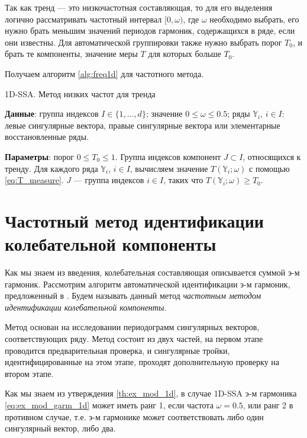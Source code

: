 \documentclass[specialist,
               substylefile = spbu.rtx,
               subf,href,colorlinks=true, 12pt]{disser}
\begin{document}
Так как тренд --- это низкочастотная составляющая, то для его выделения логично рассматривать частотный интервал $[0, \omega)$, где $\omega$ необходимо выбрать, его нужно брать меньшим значений периодов гармоник, содержащихся в ряде, если они известны.
Для автоматической группировки также нужно выбрать порог $T_0$, и брать те компоненты, значение меры $T$ для которых больше $T_0$.

Получаем алгоритм \ref{alg:freq1d} для частотного метода.

\begin{algorithm}[!hhh]
\caption{1D-SSA. Метод низких частот для тренда}
\label{alg:freq1d}
\begin{algorithmic}[1]
\REQUIRE
\item \textbf{Данные}: группа индексов $I \in \{1,\ldots,d\}$; значение  $0 \leqslant  \omega \leqslant 0.5$; ряды $\mathbb{Y}_i$, $i \in I$: левые сингулярные вектора,
правые сингулярные вектора или элементарные восстановленные ряды.
\item \textbf{Параметры}: порог $0 \leqslant T_0 \leqslant 1$.
\ENSURE Группа индексов компонент $J \subset I$, относящихся к тренду.
\STATE  Для каждого ряда $\mathbb{Y}_i$, $i \in I$, вычисляем значение $T(\mathbb{Y}_i; \omega)$ с помощью \eqref{eq:T_measure}.
\STATE $J$ --- группа индексов $i \in I$, таких что $T(\mathbb{Y}_i; \omega) \geqslant T_0$.
\end{algorithmic}
\end{algorithm}

\section{Частотный метод идентификации колебательной компоненты}
\label{sec:1d_pgram_method}

Как мы знаем из введения, колебательная составляющая описывается суммой э-м гармоник.
Рассмотрим алгоритм автоматической идентификации э-м гармоник, предложенный в \cite{Alexandrov2006}.
 Будем называть данный метод \textit{частотным методом идентификации колебательной компоненты}.

Метод основан на исследовании периодограмм сингулярных векторов, соответствующих ряду. Метод состоит из двух частей, на первом этапе проводится предварительная проверка, и сингулярные тройки, идентифицированные на этом этапе, проходят дополнительную проверку на втором этапе.

Как мы знаем из утверждения \ref{th:ex_mod_1d}, в случае 1D-SSA э-м гармоника \eqref{eq:ex_mod_garm_1d} может иметь ранг 1, если частота $\omega=0.5$, или ранг 2 в противном случае, т.е. э-м гармонике может соответствовать либо один сингулярный вектор, либо два.
\end{document}
